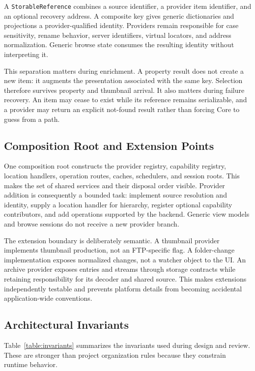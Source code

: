 \documentclass[10pt,a4paper,twoside]{article}
\begin{document}
A \texttt{StorableReference} combines a source identifier, a provider item identifier, and an optional recovery
address. A composite key gives generic dictionaries and projections a provider-qualified identity. Providers
remain responsible for case sensitivity, rename behavior, server identifiers, virtual locators, and address
normalization. Generic browse state consumes the resulting identity without interpreting it.

This separation matters during enrichment. A property result does not create a new item: it augments the
presentation associated with the same key. Selection therefore survives property and thumbnail arrival. It also
matters during failure recovery. An item may cease to exist while its reference remains serializable, and a
provider may return an explicit not-found result rather than forcing Core to guess from a path.

\subsection{Composition Root and Extension Points}

One composition root constructs the provider registry, capability registry, location handlers, operation
routes, caches, schedulers, and session roots. This makes the set of shared services and their disposal order
visible. Provider addition is consequently a bounded task: implement source resolution and identity, supply a
location handler for hierarchy, register optional capability contributors, and add operations supported by the
backend. Generic view models and browse sessions do not receive a new provider branch.

The extension boundary is deliberately semantic. A thumbnail provider implements thumbnail production, not an
FTP-specific flag. A folder-change implementation exposes normalized changes, not a watcher object to the UI. An
archive provider exposes entries and streams through storage contracts while retaining responsibility for its
decoder and shared source. This makes extensions independently testable and prevents platform details from
becoming accidental application-wide conventions.

\subsection{Architectural Invariants}

Table~\ref{table:invariants} summarizes the invariants used during design and review. These are stronger than
project organization rules because they constrain runtime behavior.
\end{document}
